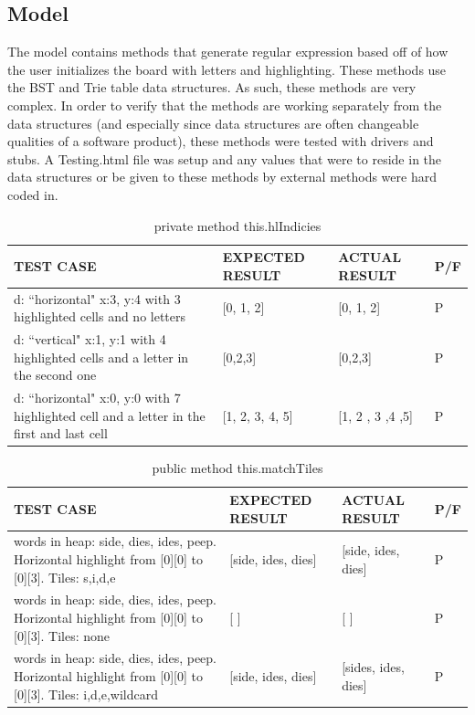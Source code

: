 \documentclass[11pt, oneside]{article}
\begin{document}
\subsection{Model}
The model contains methods that generate regular expression based off of how the user initializes the board with letters and highlighting.  These methods use the BST and Trie table data structures.  As such, these methods are very complex.  In order to verify that the methods are working separately from the data structures (and especially since data structures are often changeable qualities of a software product), these methods were tested with drivers and stubs.  A Testing.html file was setup and any values that were to reside in the data structures or be given to these methods by external methods were hard coded in.  

\begin{table}[hl]
\caption{private method this.hlIndicies}
\begin{center}
\begin{tabular}{|p{}|p{}|p{}|p{}|}

\hline
\textbf{TEST CASE} & \textbf{EXPECTED RESULT} & \textbf{ACTUAL RESULT} & P/F \\
\hline
d: ``horizontal" x:3, y:4 with 3 highlighted cells and no letters & [0, 1, 2] & [0, 1, 2] & P \\
\hline
d: ``vertical" x:1, y:1 with 4 highlighted cells and a letter in the second one & [0,2,3] & [0,2,3] & P \\
\hline
d: ``horizontal" x:0, y:0 with 7 highlighted cell and a letter in the first and last cell & [1, 2, 3, 4, 5] & [1, 2 , 3 ,4 ,5] & P \\
\hline
\end{tabular}
\end{center}
\label{default}
\end{table}%

\begin{table}[hl]
\caption{public method this.matchTiles}
\begin{center}
\begin{tabular}{|p{}|p{}|p{}|p{}|}

\hline
\textbf{TEST CASE} & \textbf{EXPECTED RESULT} & \textbf{ACTUAL RESULT} & P/F \\
\hline
words in heap: side, dies, ides, peep. Horizontal highlight from [0][0] to [0][3]. Tiles: s,i,d,e
& [side, ides, dies] & [side, ides, dies] & P \\
\hline
words in heap: side, dies, ides, peep. Horizontal highlight from [0][0] to [0][3]. Tiles: none & [ ] & [ ] & P \\
\hline
words in heap: side, dies, ides, peep. Horizontal highlight from [0][0] to [0][3]. Tiles: i,d,e,wildcard & [side, ides, dies] & [sides, ides, dies] & P \\
\hline


\hline
\end{tabular}
\end{center}
\label{default}
\end{table}%
\end{document}
